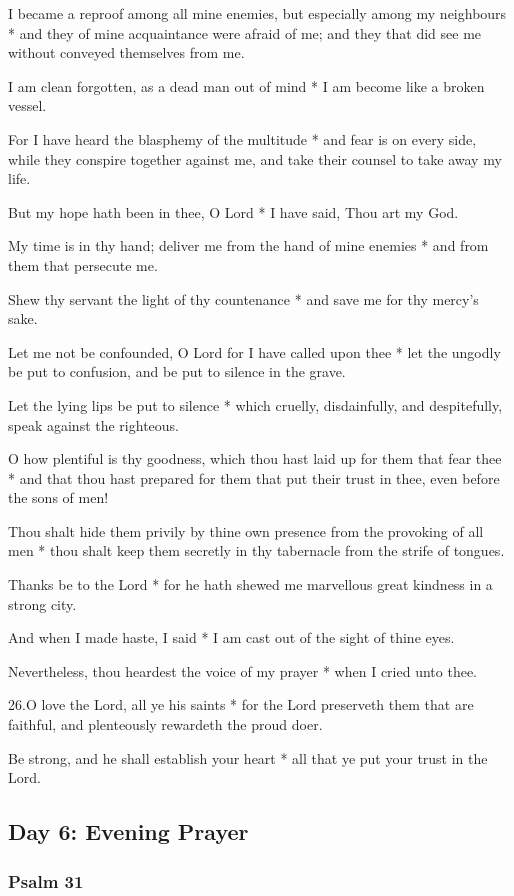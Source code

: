 I became a reproof among all mine enemies, but especially among my neighbours * and they of mine acquaintance were afraid of me; and they that did see me without conveyed themselves from me.

I am clean forgotten, as a dead man out of mind * I am become like a broken vessel.

For I have heard the blasphemy of the multitude * and fear is on every side, while they conspire together against me, and take their counsel to take away my life.

But my hope hath been in thee, O Lord * I have said, Thou art my God.

My time is in thy hand; deliver me from the hand of mine enemies * and from them that persecute me.

Shew thy servant the light of thy countenance * and save me for thy mercy's sake.

Let me not be confounded, O Lord for I have called upon thee * let the ungodly be put to confusion, and be put to silence in the grave.

Let the lying lips be put to silence * which cruelly, disdainfully, and despitefully, speak against the righteous.

O how plentiful is thy goodness, which thou hast laid up for them that fear thee * and that thou hast prepared for them that put their trust in thee, even before the sons of men!

Thou shalt hide them privily by thine own presence from the provoking of all men * thou shalt keep them secretly in thy tabernacle from the strife of tongues.

Thanks be to the Lord * for he hath shewed me marvellous great kindness in a strong city.

And when I made haste, I said * I am cast out of the sight of thine eyes.

Nevertheless, thou heardest the voice of my prayer * when I cried unto thee.

26.O love the Lord, all ye his saints * for the Lord preserveth them that are faithful, and plenteously rewardeth the proud doer.

Be strong, and he shall establish your heart * all that ye put your trust in the Lord.

\subsection{Day 6: Evening Prayer}

\subsubsection{Psalm 31}

